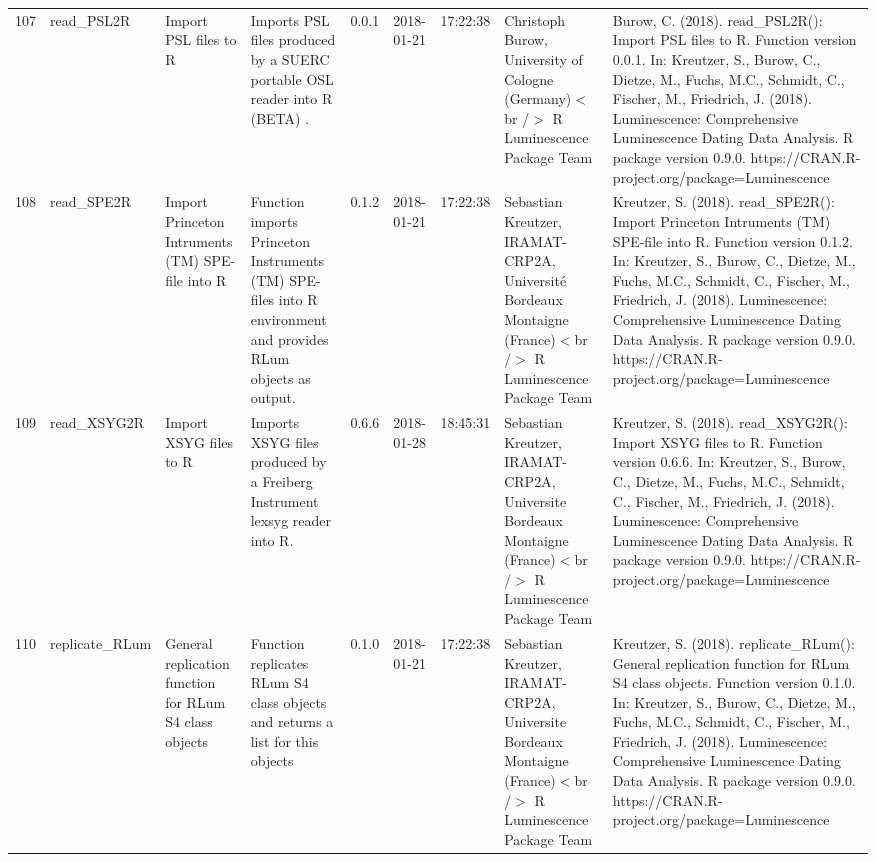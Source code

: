 \begin{table}[ht]
\begin{tabular}{rllllllll}
 \\ 
  107 & read\_PSL2R & Import PSL files to R & Imports PSL files produced by a SUERC portable OSL reader into R  (BETA) . & 0.0.1 & 2018-01-21 & 17:22:38
 & Christoph Burow, University of Cologne (Germany)$<$br /$>$  R Luminescence Package Team & Burow, C. (2018). read\_PSL2R(): Import PSL files to R. Function version 0.0.1. In: Kreutzer, S., Burow, C., Dietze, M., Fuchs, M.C., Schmidt, C., Fischer, M., Friedrich, J. (2018). Luminescence: Comprehensive Luminescence Dating Data Analysis. R package version 0.9.0. https://CRAN.R-project.org/package=Luminescence
 \\ 
  108 & read\_SPE2R & Import Princeton Intruments (TM) SPE-file into R & Function imports Princeton Instruments (TM) SPE-files into R environment and provides  RLum  objects as output. & 0.1.2 & 2018-01-21 & 17:22:38
 & Sebastian Kreutzer, IRAMAT-CRP2A, Université Bordeaux Montaigne (France)$<$br /$>$  R Luminescence Package Team & Kreutzer, S. (2018). read\_SPE2R(): Import Princeton Intruments (TM) SPE-file into R. Function version 0.1.2. In: Kreutzer, S., Burow, C., Dietze, M., Fuchs, M.C., Schmidt, C., Fischer, M., Friedrich, J. (2018). Luminescence: Comprehensive Luminescence Dating Data Analysis. R package version 0.9.0. https://CRAN.R-project.org/package=Luminescence
 \\ 
  109 & read\_XSYG2R & Import XSYG files to R & Imports XSYG files produced by a Freiberg Instrument lexsyg reader into R. & 0.6.6 & 2018-01-28 & 18:45:31
 & Sebastian Kreutzer, IRAMAT-CRP2A, Universite Bordeaux Montaigne (France)$<$br /$>$  R Luminescence Package Team & Kreutzer, S. (2018). read\_XSYG2R(): Import XSYG files to R. Function version 0.6.6. In: Kreutzer, S., Burow, C., Dietze, M., Fuchs, M.C., Schmidt, C., Fischer, M., Friedrich, J. (2018). Luminescence: Comprehensive Luminescence Dating Data Analysis. R package version 0.9.0. https://CRAN.R-project.org/package=Luminescence
 \\ 
  110 & replicate\_RLum & General replication function for RLum S4 class objects & Function replicates RLum S4 class objects and returns a list for this objects & 0.1.0 & 2018-01-21 & 17:22:38
 & Sebastian Kreutzer, IRAMAT-CRP2A, Universite Bordeaux Montaigne (France)$<$br /$>$  R Luminescence Package Team & Kreutzer, S. (2018). replicate\_RLum(): General replication function for RLum S4 class objects. Function version 0.1.0. In: Kreutzer, S., Burow, C., Dietze, M., Fuchs, M.C., Schmidt, C., Fischer, M., Friedrich, J. (2018). Luminescence: Comprehensive Luminescence Dating Data Analysis. R package version 0.9.0. https://CRAN.R-project.org/package=Luminescence

\end{tabular}
\end{table}
